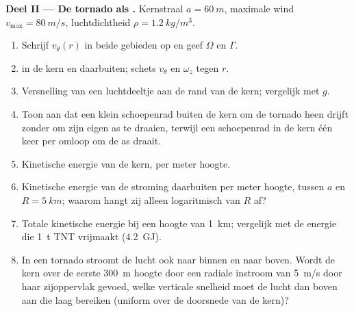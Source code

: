 \begin{problem}
\medskip
\noindent\textbf{Deel II --- De tornado als .}
Kernstraal $a = \qty{60}{m}$, maximale wind $v_{\max} = \qty{80}{m/s}$,
luchtdichtheid $\rho = \qty{1.2}{kg/m^3}$.
\begin{enumerate}[resume]
  \item Schrijf $v_\theta(r)$ in beide gebieden op en geef $\Omega$ en $\Gamma$.
  \item {} in de kern en daarbuiten; schets $v_\theta$ en
        $\omega_z$ tegen $r$.
  \item Versnelling van een luchtdeeltje aan de rand van de kern; vergelijk met $g$.
  \item Toon aan dat een klein schoepenrad buiten de kern om de tornado heen
        drijft zonder om zijn eigen as te draaien, terwijl een schoepenrad
        in de kern één keer per omloop om de as draait.
  \item Kinetische energie van de kern, per meter hoogte.
  \item Kinetische energie van de stroming daarbuiten per meter hoogte,
        tussen $a$ en $R = \qty{5}{km}$; waarom hangt zij alleen
        logaritmisch van $R$ af?
  \item Totale kinetische energie bij een hoogte van \qty{1}{km}; vergelijk
        met de energie die \qty{1}{t} TNT vrijmaakt (\qty{4.2}{GJ}).
  \item In een tornado stroomt de lucht ook naar binnen en naar boven. Wordt
        de kern over de eerste \qty{300}{m} hoogte door een radiale instroom
        van \qty{5}{m/s} door haar zijoppervlak gevoed, welke verticale
        snelheid moet de lucht dan boven aan die laag bereiken (uniform over
        de doorsnede van de kern)?
\end{enumerate}


\end{problem}
